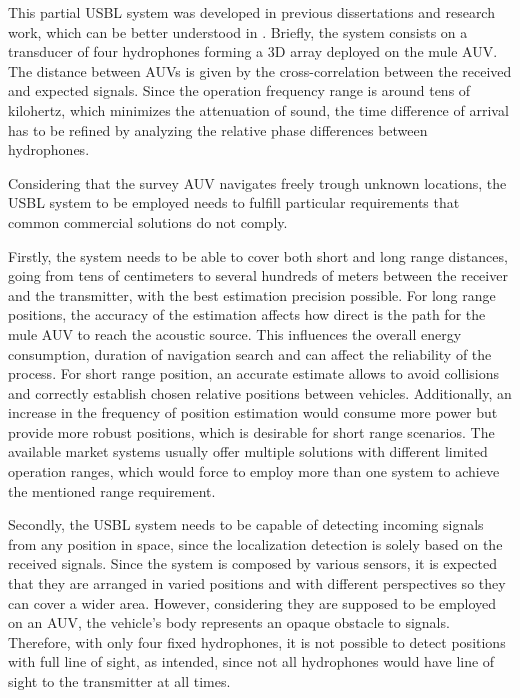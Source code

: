This partial USBL system was developed in previous dissertations and research work, which can be better understood in \cite{afonso-thesis}. Briefly, the system consists on a transducer of four hydrophones forming a 3D array deployed on the mule AUV. The distance between AUVs is given by the cross-correlation between the received and expected signals. Since the operation frequency range is around tens of kilohertz, which minimizes the attenuation of sound, the time difference of arrival has to be refined by analyzing the relative phase differences between hydrophones.

Considering that the survey AUV navigates freely trough unknown locations, the USBL system to be employed needs to fulfill particular requirements that common commercial solutions do not comply. 

Firstly, the system needs to be able to cover both short and long range distances, going from tens of centimeters to several hundreds of meters between the receiver and the transmitter, with the best estimation precision possible. For long range positions, the accuracy of the estimation affects how direct is the path for the mule AUV to reach the acoustic source. This influences the overall energy consumption, duration of navigation search and can affect the reliability of the process. For short range position, an accurate estimate allows to avoid collisions and correctly establish chosen relative positions between vehicles. Additionally, an increase in the frequency of position estimation would consume more power but provide more robust positions, which is desirable for short range scenarios. The available market systems usually offer multiple solutions with different limited operation ranges, which would force to employ more than one system to achieve the mentioned range requirement.

Secondly, the USBL system needs to be capable of detecting incoming signals from any position in space, since the localization detection is solely based on the received signals. Since the system is composed by various sensors, it is expected that they are arranged in varied positions and with different perspectives so they can cover a wider area. However, considering they are supposed to be employed on an AUV, the vehicle's body represents an opaque obstacle to signals. Therefore, with only four fixed hydrophones, it is not possible to detect positions with full line of sight, as intended, since not all hydrophones would have line of sight to the transmitter at all times.

